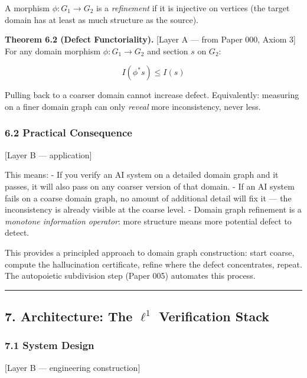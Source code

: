 \documentclass[
]{article}
\begin{document}
A morphism \(\phi: G_1 \to G_2\) is a \emph{refinement} if it is
injective on vertices (the target domain has at least as much structure
as the source).

\textbf{Theorem 6.2 (Defect Functoriality).} {[}Layer A --- from Paper
000, Axiom 3{]} For any domain morphism \(\phi: G_1 \to G_2\) and
section \(s\) on \(G_2\):

\[I(\phi^* s) \leq I(s)\]

Pulling back to a coarser domain cannot increase defect. Equivalently:
measuring on a finer domain graph can only \emph{reveal} more
inconsistency, never less.

\subsubsection{6.2 Practical Consequence}\label{practical-consequence}

{[}Layer B --- application{]}

This means: - If you verify an AI system on a detailed domain graph and
it passes, it will also pass on any coarser version of that domain. - If
an AI system fails on a coarse domain graph, no amount of additional
detail will fix it --- the inconsistency is already visible at the
coarse level. - Domain graph refinement is a \emph{monotone information
operator}: more structure means more potential defect to detect.

This provides a principled approach to domain graph construction: start
coarse, compute the hallucination certificate, refine where the defect
concentrates, repeat. The autopoietic subdivision step (Paper 005)
automates this process.

\begin{center}\rule{0.5\linewidth}{0.5pt}\end{center}

\subsection{\texorpdfstring{7. Architecture: The \(\ell^1\) Verification
Stack}{7. Architecture: The \textbackslash ell\^{}1 Verification Stack}}\label{architecture-the-ell1-verification-stack}

\subsubsection{7.1 System Design}\label{system-design}

{[}Layer B --- engineering construction{]}
\end{document}
